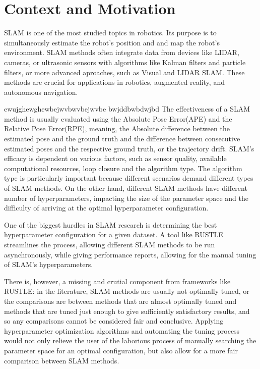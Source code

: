 \section{Context and Motivation}

\par
\ac{SLAM} is one of the most studied topics in robotics. Its purpose is to simultaneously estimate the robot's position and and map the robot's environment. SLAM methods often integrate data from devices like LIDAR, cameras, or ultrasonic sensors with algorithms like Kalman filters and particle filters, or more advanced aproaches, such as Visual and LIDAR SLAM. These methods are crucial for applications in robotics, augmented reality, and autonomous navigation.
\par

ewujghewghewbejwvbwvbejwvbe  bwjddbwbdwjbd
The effectiveness of a SLAM method is usually evaluated using the Absolute Pose Error(APE) and the Relative Pose Error(RPE), meaning, the Absolute difference between the estimated pose and the ground truth and the difference between consecutive estimated poses and the respective ground truth, or the trajectory drift. SLAM's efficacy is dependent on various factors, such as sensor quality, available computational resources, loop closure and the algorithm type. The algorithm type is particularly important because different scenarios demand different types of SLAM methods. On the other hand, different SLAM methods have different number of hyperparameters, impacting the size of the parameter space and the difficulty of arriving at the optimal hyperparameter configuration.
\par
One of the biggest hurdles in SLAM research is determining the best hyperparameter configuration for a given dataset. A tool like RUSTLE streamlines the process, allowing different SLAM methods to be run asynchronously, while giving performance reports, allowing for the manual tuning of SLAM's hyperparameters.
\par
There is, however, a missing and crutial component from frameworks like RUSTLE: in the literature, SLAM methods are usually not optimally tuned, or the comparisons are between methods that are almost optimally tuned and methods that are tuned just enough to give sufficiently satisfactory results, and so any comparisons cannot be considered fair and conclusive. Applying hyperparameter optimization algorithms and automating the tuning process would not only relieve the user of the laborious process of manually searching the parameter space for an optimal configuration, but also allow for a more fair comparison between SLAM methods.

